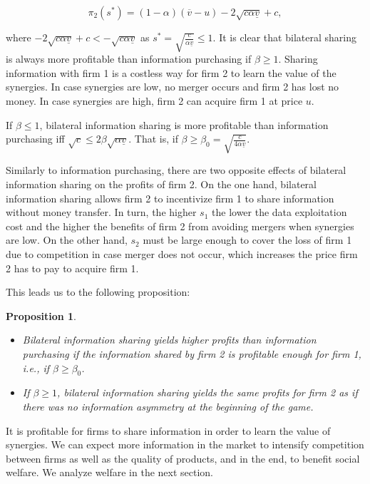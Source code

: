 \documentclass[a4paper,leqno]{article}%
\newtheorem{prop}{Proposition}
\renewcommand{\a}{\alpha}
\newcommand{\uv}{\underline{v}}
\newcommand{\ov}{\overline{v}}
\begin{document}
$$\pi_2(s^*)=(1-\a)(\ov-u)-2\sqrt{c\a \uv}+c,$$

\noindent where $-2\sqrt{c\a \uv}+c<-\sqrt{c\a \uv}$ as $s^*=\sqrt{\frac{c}{\a\uv}}\leq 1$. It is clear that bilateral sharing is always more profitable than information purchasing if $\beta\geq1$. Sharing information with firm 1 is a costless way for firm 2 to learn the value of the synergies. In case synergies are low, no merger occurs and firm 2 has lost no money. In case synergies are high, firm 2 can acquire firm 1 at price $u$.

\medskip

If $\beta\leq1$, bilateral information sharing is more profitable than information purchasing iff $\sqrt{c}\leq 2\beta \sqrt{\a \uv}$. That is, if $\beta\geq\beta_0=\sqrt{\frac{c}{4\a \uv}}$.

\medskip

%
Similarly to information purchasing, there are two opposite effects of bilateral information sharing on the profits of firm 2. On the one hand, bilateral information sharing allows firm 2 to incentivize firm 1 to share information without money transfer. In turn, the higher $s_1$ the lower the data exploitation cost and the higher the benefits of firm 2 from avoiding mergers when synergies are low. On the other hand, $s_2$ must be large enough to cover the loss of firm 1 due to competition in case merger does not occur, which increases the price firm 2 has to pay to acquire firm 1. 

\medskip

This leads us to the following proposition:

\begin{prop}~~
\begin{itemize}
    \item Bilateral information sharing yields higher profits than information purchasing if the information shared by firm 2 is profitable enough for firm 1, i.e., if $\beta\geq\beta_0$.
    \item If $\beta\geq 1$, bilateral information sharing yields the same profits for firm 2 as if there was no information asymmetry at the beginning of the game.
\end{itemize}

\end{prop}

\noindent It is profitable for firms to share information in order to learn the value of synergies. We can expect more information in the market to intensify competition between firms as well as the quality of products, and in the end, to benefit social welfare. We analyze welfare in the next section.
\end{document}
